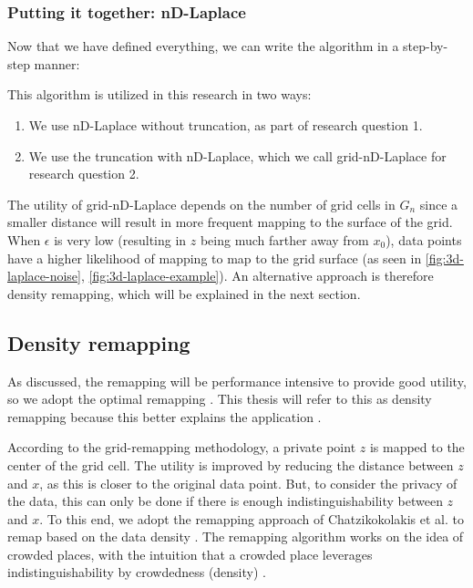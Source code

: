 \subsubsection{Putting it together: nD-Laplace}
Now that we have defined everything, we can write the algorithm in a step-by-step manner:

This algorithm is utilized in this research in two ways:
\begin{enumerate}
    \item We use nD-Laplace without truncation, as part of research question 1.
    \item We use the truncation with nD-Laplace, which we call grid-nD-Laplace for research question 2.
\end{enumerate}

The utility of grid-nD-Laplace depends on the number of grid cells in $G_n$ since a smaller distance will result in more frequent mapping to the surface of the grid.
When $\epsilon$ is very low (resulting in $z$ being much farther away from $x_0$), data points have a higher likelihood of mapping to map to the grid surface 
(as seen in \ref{fig:3d-laplace-noise}, \ref{fig:3d-laplace-example}). 
An alternative approach is therefore density remapping, which will be explained in the next section.
\newpage
\subsection{Density remapping} \label{theory:optimal-remapping}
As discussed, the remapping will be performance intensive to provide good utility, so we adopt the optimal remapping \citep{chatzikokolakis_efficient_2017}.
This thesis will refer to this as density remapping because this better explains the application .

According to the grid-remapping methodology, a private point $z$ is mapped to the center of the grid cell.
The utility is improved by reducing the distance between $z$ and $x$, as this is closer to the original data point.
But, to consider the privacy of the data, this can only be done if there is enough indistinguishability between $z$ and $x$.
To this end, we adopt the remapping approach of Chatzikokolakis et al. to remap based on the data density \citep{chatzikokolakis_efficient_2017}.
The remapping algorithm works on the idea of crowded places, with the intuition that a crowded place leverages indistinguishability by crowdedness (density) \citep{chatzikokolakis_efficient_2017}.  \newline

